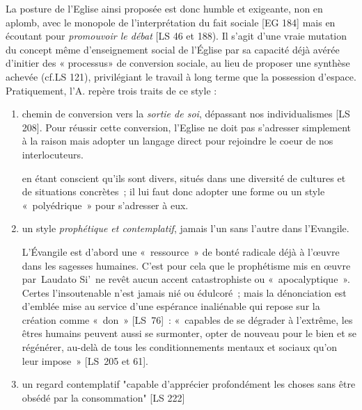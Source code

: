 La posture de l'Eglise ainsi proposée est donc humble et exigeante, non en aplomb, avec le monopole de l'interprétation du fait sociale [EG 184] mais en écoutant pour \textit{promouvoir le débat} [LS 46 et 188).  Il s'agit d'une vraie mutation du concept même d’enseignement social de l’Église par sa capacité déjà avérée d’initier des « processus» de conversion sociale, au lieu de proposer une synthèse achevée (cf.LS 121), privilégiant le travail à long terme que la possession d'espace. Pratiquement, l'A. repère trois traits de ce style :
\begin{enumerate}
    \item chemin de conversion vers la \textit{sortie de soi}, dépassant nos individualismes [LS 208]. Pour réussir cette conversion, l'Eglise ne doit pas s'adresser simplement à la raison mais adopter un langage direct pour rejoindre le coeur de nos interlocuteurs. 
    \begin{singlequote}
        [\ldots] en étant conscient qu’ils sont divers, situés dans une diversité de cultures et de situations concrètes ; il lui faut donc adopter une forme ou un style « polyédrique » pour s’adresser à eux. \cite[par. 44]{theobald_lenseignement_2016}
    \end{singlequote}
    \item un style \textit{prophétique et contemplatif}, jamais l'un sans l'autre dans l'Evangile. 
    \begin{singlequote}
        L’Évangile est d’abord une « ressource » de bonté radicale déjà à l’œuvre dans les sagesses humaines. C’est pour cela que le prophétisme mis en œuvre par Laudato Si’ ne revêt aucun accent catastrophiste ou « apocalyptique ». Certes l’insoutenable n’est jamais nié ou édulcoré ; mais la dénonciation est d’emblée mise au service d’une espérance inaliénable qui repose sur la création comme « don » [LS 76] : « capables de se dégrader à l’extrême, les êtres humains peuvent aussi se surmonter, opter de nouveau pour le bien et se régénérer, au-delà de tous les conditionnements mentaux et sociaux qu’on leur impose » [LS 205 et 61].\cite[par. 45]{theobald_lenseignement_2016}
    \end{singlequote}
    \item un regard contemplatif "capable d'apprécier profondément les choses sans être obsédé par la consommation" [LS 222]
\end{enumerate}




